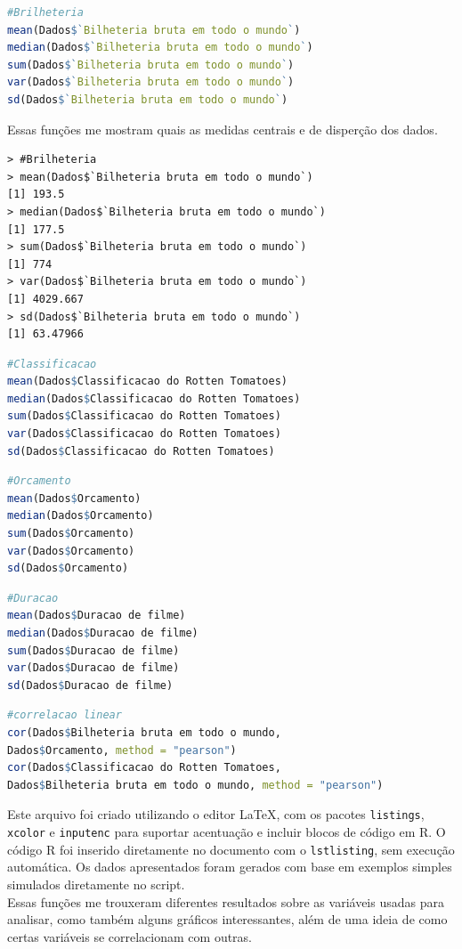 \documentclass[
    12pt,                  %
    openright,             %
    oneside,               %
    a4paper,               %
    chapter=TITLE,         %
    section=TITLE,         %
    brazil                 %
]{abntex2}                 %
\begin{document}
\begin{lstlisting}[language=R]
#Brilheteria
mean(Dados$`Bilheteria bruta em todo o mundo`)
median(Dados$`Bilheteria bruta em todo o mundo`)
sum(Dados$`Bilheteria bruta em todo o mundo`)
var(Dados$`Bilheteria bruta em todo o mundo`)
sd(Dados$`Bilheteria bruta em todo o mundo`)
\end{lstlisting}
Essas funções me mostram quais as medidas centrais e de disperção dos dados.
\newpage
\begin{lstlisting}[label={lst:saidaR}]
> #Brilheteria
> mean(Dados$`Bilheteria bruta em todo o mundo`)
[1] 193.5
> median(Dados$`Bilheteria bruta em todo o mundo`)
[1] 177.5
> sum(Dados$`Bilheteria bruta em todo o mundo`)
[1] 774
> var(Dados$`Bilheteria bruta em todo o mundo`)
[1] 4029.667
> sd(Dados$`Bilheteria bruta em todo o mundo`)
[1] 63.47966
\end{lstlisting}
\begin{lstlisting}[language=R]
#Classificacao
mean(Dados$Classificacao do Rotten Tomatoes)
median(Dados$Classificacao do Rotten Tomatoes)
sum(Dados$Classificacao do Rotten Tomatoes)
var(Dados$Classificacao do Rotten Tomatoes)
sd(Dados$Classificacao do Rotten Tomatoes)
\end{lstlisting}

\begin{lstlisting}[language=R]
#Orcamento
mean(Dados$Orcamento)
median(Dados$Orcamento)
sum(Dados$Orcamento)
var(Dados$Orcamento)
sd(Dados$Orcamento)
\end{lstlisting}

\begin{lstlisting}[language=R]
#Duracao
mean(Dados$Duracao de filme)
median(Dados$Duracao de filme)
sum(Dados$Duracao de filme)
var(Dados$Duracao de filme)
sd(Dados$Duracao de filme)
\end{lstlisting}

\begin{lstlisting}[language=R]
#correlacao linear
cor(Dados$Bilheteria bruta em todo o mundo, 
Dados$Orcamento, method = "pearson")
cor(Dados$Classificacao do Rotten Tomatoes, 
Dados$Bilheteria bruta em todo o mundo, method = "pearson")
\end{lstlisting}
Este arquivo foi criado utilizando o editor \LaTeX, com os pacotes \texttt{listings}, \texttt{xcolor} e \texttt{inputenc} para suportar acentuação e incluir blocos de código em R. O código R foi inserido diretamente no documento com o \texttt{lstlisting}, sem execução automática. Os dados apresentados foram gerados com base em exemplos simples simulados diretamente no script. \\ 
\noindent Essas funções me trouxeram diferentes resultados sobre as variáveis usadas para analisar, como também alguns gráficos interessantes, além de uma ideia de como certas variáveis se correlacionam com outras. 
\end{document}

